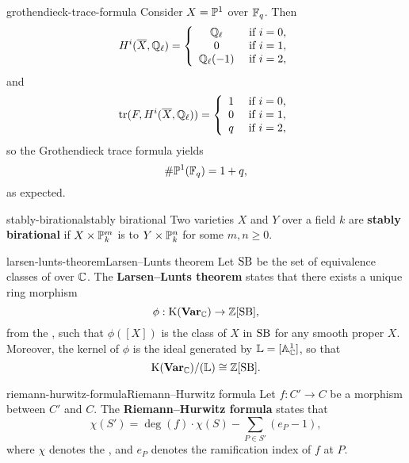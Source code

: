\begin{example}{grothendieck-trace-formula}
    Consider $X = \mathbb{P}^1$ over $\mathbb{F}_q$. Then
    \[ H^i(\overline{X}, \mathbb{Q}_\ell) = \left\{ \begin{array}{cl}
        \mathbb{Q}_\ell & \textup{ if } i = 0, \\
        0 & \textup{ if } i = 1, \\
        \mathbb{Q}_\ell(-1) & \textup{ if } i = 2, \\
    \end{array} \right. \]
    and
    \[ \operatorname{tr}(F, H^i(\overline{X}, \mathbb{Q}_\ell)) = \left\{ \begin{array}{cl}
        1 & \textup{ if } i = 0, \\
        0 & \textup{ if } i = 1, \\
        q & \textup{ if } i = 2, \\
    \end{array} \right. \]
    so the Grothendieck trace formula yields
    \[ \# \mathbb{P}^1(\mathbb{F}_q) = 1 + q , \]
    as expected.
\end{example}

\begin{topic}{stably-birational}{stably birational}
    Two varieties $X$ and $Y$ over a field $k$ are \textbf{stably birational} if $X \times \mathbb{P}^m_k$ is  to $Y \times \mathbb{P}^n_k$ for some $m, n \ge 0$.
\end{topic}

\begin{topic}{larsen-lunts-theorem}{Larsen--Lunts theorem}
    Let $\textup{SB}$ be the set of  equivalence classes of    over $\mathbb{C}$. The \textbf{Larsen--Lunts theorem} states that there exists a unique ring morphism
    \[ \phi : \textup{K}(\textbf{Var}_{\mathbb{C}}) \to \mathbb{Z}[\textup{SB}] , \]
    from the , such that $\phi([X])$ is the class of $X$ in $\textup{SB}$ for any smooth proper $X$. Moreover, the kernel of $\phi$ is the ideal generated by $\mathbb{L} = [\mathbb{A}^1_{\mathbb{C}}]$, so that
    \[ \textup{K}(\textbf{Var}_{\mathbb{C}}) / (\mathbb{L}) \cong \mathbb{Z}[\textup{SB}] . \]
\end{topic}

\begin{topic}{riemann-hurwitz-formula}{Riemann--Hurwitz formula}
    Let $f : C' \to C$ be a morphism between    $C'$ and $C$. The \textbf{Riemann--Hurwitz formula} states that
    \[ \chi(S') = \deg(f) \cdot \chi(S) - \sum_{P \in S'} (e_P - 1) , \]
    where $\chi$ denotes the , and $e_P$ denotes the ramification index of $f$ at $P$.
\end{topic}

